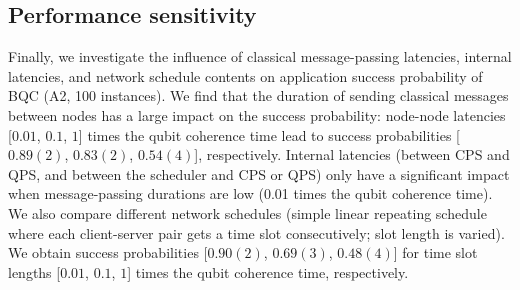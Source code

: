 \subsection{Performance sensitivity}
\label{qoala:sec:performance_sensitivity}
Finally, we investigate the influence of classical message-passing latencies, internal latencies, and network schedule contents on application success probability of BQC (A2, 100 instances).
We find that the duration of sending classical messages between nodes has a large impact on the success probability:
node-node latencies [$0.01$, $0.1$, $1$] times the qubit coherence time lead to success probabilities [$0.89(2)$, $0.83(2)$, $0.54(4)$], respectively.
Internal latencies (between CPS and QPS, and between the scheduler and CPS or QPS) only have a significant impact when message-passing durations are low (0.01 times the qubit coherence time).
We also compare different network schedules (simple linear repeating schedule where each client-server pair gets a time slot consecutively; slot length is varied).
We obtain success probabilities [$0.90(2)$, $0.69(3)$, $0.48(4)$] for time slot lengths [$0.01$, $0.1$, $1$] times the qubit coherence time, respectively.
